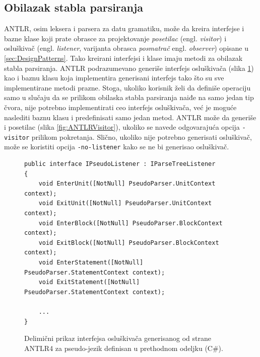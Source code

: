 \subsection{Obilazak stabla parsiranja}
\label{subsec:ANTLRParserIntegration}

ANTLR, osim leksera i parsera za datu gramatiku, može da kreira interfejse i bazne klase koji prate obrasce za projektovanje \emph{posetilac} (engl. \emph{visitor}) i osluškivač (engl. \emph{listener}, varijanta obrasca \emph{posmatrač} engl. \emph{observer}) opisane u \ref{sec:DesignPatterns}. Tako kreirani interfejsi i klase imaju metodi za obilazak stabla parsiranja. ANTLR podrazumevano generiše interfejs osluškivača (slika \ref{fig:ANTLRListener}) kao i baznu klasu koja implementira generisani interfejs tako što su sve implementirane metodi prazne. Stoga, ukoliko korisnik želi da definiše operaciju samo u slučaju da se prilikom obilaska stabla parsiranja naiđe na samo jedan tip čvora, nije potrebno implementirati ceo interfejs osluškivača, već je moguće naslediti baznu klasu i predefinisati samo jedan metod. ANTLR može da generiše i posetilac (slika \ref{fig:ANTLRVisitor}), ukoliko se navede odgovarajuća opcija \texttt{-visitor} prilikom pokretanja. Slično, ukoliko nije potrebno generisati osluškivač, može se koristiti opcija \texttt{-no-listener} kako se ne bi generisao osluškivač.

\begin{figure}[h!]
\begin{lstlisting}
public interface IPseudoListener : IParseTreeListener
{
    void EnterUnit([NotNull] PseudoParser.UnitContext context);
    void ExitUnit([NotNull] PseudoParser.UnitContext context);
    void EnterBlock([NotNull] PseudoParser.BlockContext context);
    void ExitBlock([NotNull] PseudoParser.BlockContext context);
    void EnterStatement([NotNull] PseudoParser.StatementContext context);
    void ExitStatement([NotNull] PseudoParser.StatementContext context);
    
    ...
}
\end{lstlisting}
\caption{Delimični prikaz interfejsa osluškivača generisanog od strane ANTLR4 za pseudo-jezik definisan u prethodnom odeljku (C\#).}
\label{fig:ANTLRListener}
\end{figure}

